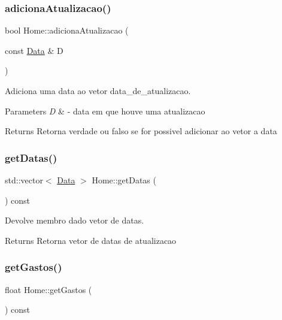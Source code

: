 \subsubsection{\texorpdfstring{adiciona\+Atualizacao()}{adicionaAtualizacao()}}
{\footnotesize\ttfamily bool Home\+::adiciona\+Atualizacao (\begin{DoxyParamCaption}\item[{const \mbox{\hyperlink{class_data}{Data}} \&}]{D }\end{DoxyParamCaption})}



Adiciona uma data ao vetor data\+\_\+de\+\_\+atualizacao. 


\begin{DoxyParams}{Parameters}
{\em D} & -\/ data em que houve uma atualizacao \\
\hline
\end{DoxyParams}
\begin{DoxyReturn}{Returns}
Retorna verdade ou falso se for possivel adicionar ao vetor a data 
\end{DoxyReturn}
\mbox{\label{class_home_a0ab7279a76525f48cb1b64b8bae98a44}} 
\subsubsection{\texorpdfstring{get\+Datas()}{getDatas()}}
{\footnotesize\ttfamily std\+::vector$<$ \mbox{\hyperlink{class_data}{Data}} $>$ Home\+::get\+Datas (\begin{DoxyParamCaption}{ }\end{DoxyParamCaption}) const}



Devolve membro dado vetor de datas. 

\begin{DoxyReturn}{Returns}
Retorna vetor de datas de atualizacao 
\end{DoxyReturn}
\mbox{\label{class_home_aff6d69739d404378524a591596b47856}} 
\subsubsection{\texorpdfstring{get\+Gastos()}{getGastos()}}
{\footnotesize\ttfamily float Home\+::get\+Gastos (\begin{DoxyParamCaption}{ }\end{DoxyParamCaption}) const\hspace{0.3cm}{\ttfamily [virtual]}}



